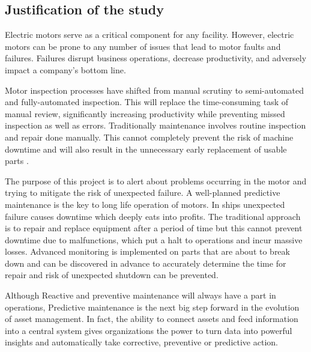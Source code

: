 \subsection{Justification of the study}
Electric motors serve as a critical component for any facility. However, electric motors can be prone to any number of issues that lead to motor faults and failures. Failures disrupt business operations, decrease productivity, and adversely impact a company’s bottom line. 

Motor inspection processes have shifted from manual scrutiny to semi-automated and fully-automated inspection. This will replace the time-consuming task of manual review, significantly increasing productivity while preventing missed inspection as well as errors. Traditionally maintenance involves routine inspection and repair done manually. This cannot completely prevent the risk of machine downtime and will also result in the unnecessary early replacement of usable parts \cite{sampaio_prediction_2019}.  


The purpose of this project is to alert about problems occurring in the motor and trying to mitigate the risk of unexpected failure. A well-planned predictive maintenance is the key to long life operation of motors. In ships unexpected failure causes downtime which deeply eats into profits. The traditional approach is to repair and replace equipment after a period of time but this cannot prevent downtime due to malfunctions, which put a halt to operations and incur massive losses. Advanced monitoring is implemented on parts that are about to break down and can be discovered in advance to accurately determine the time for repair and risk of unexpected shutdown can be prevented. \cite{sampaio_prediction_2019}

Although Reactive and preventive maintenance will always have a part in operations, Predictive maintenance is the next big step forward in the evolution of asset management. In fact, the ability to connect assets and feed information into a central system gives organizations the power to turn data into powerful insights and automatically take corrective, preventive or predictive action.
